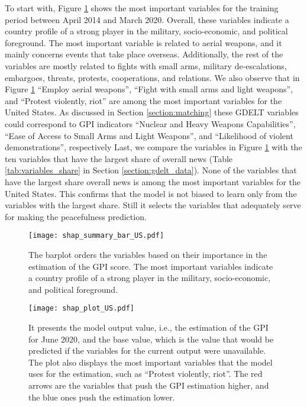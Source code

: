 \documentclass{bmcart}
\begin{document}
To start with, Figure \ref{fig:barplot_US} shows the most important variables for the training period between April 2014 and March 2020. 
Overall, these variables indicate a country profile of a strong player in the military, socio-economic, and political foreground. 
The most important variable is related to aerial weapons, and it mainly concerns events that take place overseas. Additionally, the rest of the variables are mostly related to fights with small arms, military de-escalations, embargoes, threats, protests, cooperations, and relations. 
We also observe that in Figure \ref{fig:barplot_US} ``Employ aerial weapons'', ``Fight with small arms and light weapons'', and ``Protest violently, riot'' are among the most important variables for the United States. 
As discussed in Section \ref{section:matching} these GDELT variables could correspond to GPI indicators ``Nuclear and Heavy Weapons Capabilities'', ``Ease of Access to Small Arms and Light Weapons'', and ``Likelihood of violent demonstrations'', respectively
Last, we compare the variables in Figure \ref{fig:barplot_US} with the ten variables that have the largest share of overall news (Table \ref{tab:variables_share} in Section \ref{section:gdelt_data}). None of the variables that have the largest share overall news is among the most important variables for the United States. 
This confirms that the model is not biased to learn only from the variables with the largest share. Still it selects the variables that adequately serve for making the peacefulness prediction. 

\begin{figure}[h!]
\centering
\texttt{[image: shap\_summary\_bar\_US.pdf]}
  \caption{
      The barplot orders the variables based on their importance in the estimation of the GPI score. The most important variables indicate a country profile of a strong player in the military, socio-economic, and political foreground.}
\label{fig:barplot_US}
\end{figure}

\begin{figure}[h!]
\centering
\texttt{[image: shap\_plot\_US.pdf]}
  \caption{
      It presents the model output value, i.e., the estimation of the GPI for June 2020, and the base value, which is the value that would be predicted if the variables for the current output were unavailable. The plot also displays the most important variables that the model uses for the estimation, such as ``Protest violently, riot''. The red arrows are the variables that push the GPI estimation higher, and the blue ones push the estimation lower.}
\label{fig:shap_plot_US}
\end{figure}
\end{document}

